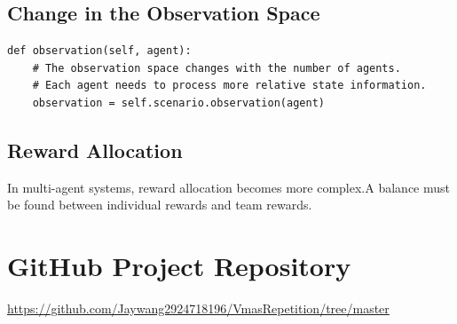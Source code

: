 \documentclass[12pt]{article}
\begin{document}
\subsection{Change in the Observation Space}
\begin{verbatim}
def observation(self, agent):
    # The observation space changes with the number of agents.
    # Each agent needs to process more relative state information.
    observation = self.scenario.observation(agent)
\end{verbatim}

\subsection{Reward Allocation}
In multi-agent systems, reward allocation becomes more complex.A balance must be found between individual rewards and team rewards.

\section{GitHub Project Repository}

\url{https://github.com/Jaywang2924718196/VmasRepetition/tree/master}
\end{document}
